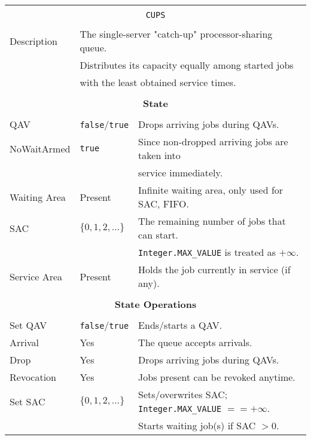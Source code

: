 \documentclass[12pt]{book}
\begin{document}
\begin{tabular}{|l|l|l|}
\hline
\multicolumn{3}{|c|}{} \\
\multicolumn{3}{|c|}{\lstinline[basicstyle=\large]{CUPS}} \\
\multicolumn{3}{|c|}{} \\
\hline
Description & \multicolumn{2}{l|}{The single-server "catch-up" processor-sharing queue.} \\
            & \multicolumn{2}{l|}{Distributes its capacity equally among started jobs} \\
            & \multicolumn{2}{l|}{with the least obtained service times.} \\
\hline
\multicolumn{3}{|c|}{} \\
\multicolumn{3}{|c|}{\bf State} \\
\multicolumn{3}{|c|}{} \\
\hline
QAV & \lstinline|false|/\lstinline|true| & Drops arriving jobs during QAVs. \\
\hline
NoWaitArmed & \lstinline|true| & Since non-dropped arriving jobs are taken into \\
            &                  & service immediately. \\
\hline
Waiting Area & Present & Infinite waiting area, only used for SAC, FIFO. \\
\hline
SAC & $\{0, 1, 2, \ldots\}$ & The remaining number of jobs that can start. \\
    &                       & \lstinline|Integer.MAX_VALUE| is treated as $+\infty$. \\
\hline
Service Area & Present & Holds the job currently in service (if any). \\
\hline
\multicolumn{3}{|c|}{} \\
\multicolumn{3}{|c|}{\bf State Operations} \\
\multicolumn{3}{|c|}{} \\
\hline
Set QAV & \lstinline|false|/\lstinline|true| & Ends/starts a QAV. \\
\hline
Arrival & Yes & The queue accepts arrivals. \\
\hline
Drop & Yes & Drops arriving jobs during QAVs. \\
\hline
Revocation & Yes & Jobs present can be revoked anytime. \\
\hline
Set SAC & $\{0, 1, 2, \ldots\}$ & Sets/overwrites SAC; \lstinline|Integer.MAX_VALUE| $== +\infty$. \\
        &                       & Starts waiting job(s) if SAC $> 0$. \\

\end{tabular}
\end{document}
